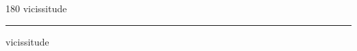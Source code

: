 
\begin{frame}
\begin{center}
\begin{turn}{180}
{\fontsize{2.5cm}{1em}\selectfont vicissitude}
\end{turn}
\vspace{1em}\par  
\hrule
\vspace{1em}\par  
{\fontsize{2.5cm}{1em}\selectfont vicissitude}
\end{center}
\end{frame}
